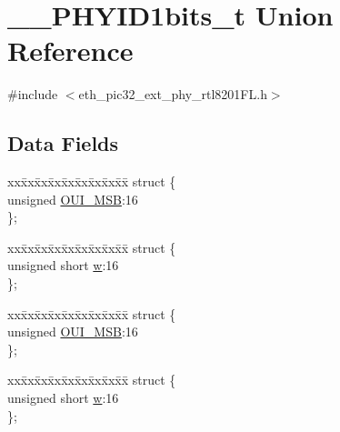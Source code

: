 \hypertarget{union_____p_h_y_i_d1bits__t}{}\section{\+\_\+\+\_\+\+P\+H\+Y\+I\+D1bits\+\_\+t Union Reference}
\label{union_____p_h_y_i_d1bits__t}


{\ttfamily \#include $<$eth\+\_\+pic32\+\_\+ext\+\_\+phy\+\_\+rtl8201\+F\+L.\+h$>$}

\subsection*{Data Fields}
\begin{DoxyCompactItemize}
\item 
\begin{tabbing}
xx\=xx\=xx\=xx\=xx\=xx\=xx\=xx\=xx\=\kill
struct \{\\
\>unsigned \hyperlink{union_____p_h_y_i_d1bits__t_ad8f0977764da80bdd20b1819a5c11036}{OUI\_MSB}:16\\
\}; \\

\end{tabbing}\item 
\begin{tabbing}
xx\=xx\=xx\=xx\=xx\=xx\=xx\=xx\=xx\=\kill
struct \{\\
\>unsigned short \hyperlink{union_____p_h_y_i_d1bits__t_a160850a4684a3e82c2323033964f2e98}{w}:16\\
\}; \\

\end{tabbing}\item 
\begin{tabbing}
xx\=xx\=xx\=xx\=xx\=xx\=xx\=xx\=xx\=\kill
struct \{\\
\>unsigned \hyperlink{union_____p_h_y_i_d1bits__t_ad8f0977764da80bdd20b1819a5c11036}{OUI\_MSB}:16\\
\}; \\

\end{tabbing}\item 
\begin{tabbing}
xx\=xx\=xx\=xx\=xx\=xx\=xx\=xx\=xx\=\kill
struct \{\\
\>unsigned short \hyperlink{union_____p_h_y_i_d1bits__t_a160850a4684a3e82c2323033964f2e98}{w}:16\\
\}; \\

\end{tabbing}\end{DoxyCompactItemize}


